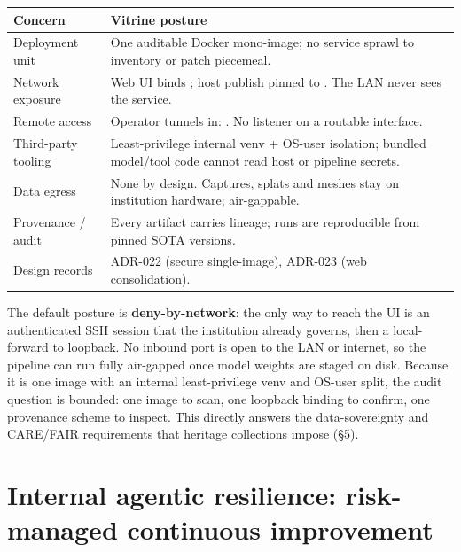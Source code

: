 \documentclass[a4paper,11pt]{article}
\begin{document}
\begin{center}\small
\begin{tabularx}{\textwidth}{@{}L{4.1cm} X@{}}
\toprule
\textbf{Concern} & \textbf{Vitrine posture} \\
\midrule
Deployment unit      & One auditable Docker mono-image; no service sprawl to inventory or patch piecemeal. \\
Network exposure     & Web UI binds ; host publish pinned to . The LAN never sees the service. \\
Remote access        & Operator tunnels in: . No listener on a routable interface. \\
Third-party tooling  & Least-privilege internal venv + OS-user isolation; bundled model/tool code cannot read host or pipeline secrets. \\
Data egress          & None by design. Captures, splats and meshes stay on institution hardware; air-gappable. \\
Provenance / audit   & Every artifact carries  lineage; runs are reproducible from pinned SOTA versions. \\
Design records       & ADR-022 (secure single-image), ADR-023 (web consolidation). \\
\bottomrule
\end{tabularx}
\end{center}

\begin{technote}
The default posture is \textbf{deny-by-network}: the only way to reach the UI is an
authenticated SSH session that the institution already governs, then a local-forward to
loopback. No inbound port is open to the LAN or internet, so the pipeline can run fully
air-gapped once model weights are staged on disk. Because it is one image with an internal
least-privilege venv and OS-user split, the audit question is bounded: one image to scan, one
loopback binding to confirm, one provenance scheme to inspect. This directly answers the
data-sovereignty and CARE/FAIR requirements that heritage collections impose (\S5).
\end{technote}

\section{Internal agentic resilience: risk-managed continuous improvement}
\end{document}
